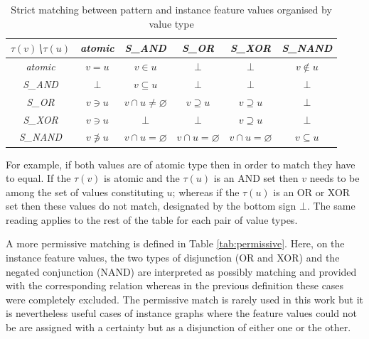 \begin{table}[!ht]
    \centering
    \begin{tabular}{|c|c|c|c|c|c|}
        \hline
        \textit{$\tau(v)$\textbackslash $\tau(u)$} & \textit{atomic} & \textit{S_{AND}}                 & \textit{S_{OR}}              & \textit{S_{XOR}}             & \textit{S_{NAND}}            \\ \hline
        \textit{atomic}             & $v=u$             & $v \in u$                         & $\bot$                          & $\bot$                          & $v \notin u$                   \\ \hline
        \textit{S_{AND}}              & $\bot$               & $v \subseteq u$                     & $\bot$                          & $\bot$                          & $\bot$ \\ \hline
        \textit{S_{OR}}               & $v \ni u$          & $ v \cap u \neq \varnothing $ &                        $v \supseteq u $              & $v \supseteq u $   & $\bot$ \\ \hline
        \textit{S_{XOR}}              & $v \ni u$          & $\bot$                              & $\bot$                        & $v \supseteq u$             & $\bot$ \\ \hline
        \textit{S_{NAND}}             & $v \not\ni u$      & $v \cap u = \varnothing$     & $v \cap u = \varnothing$ & $v \cap u = \varnothing$ & $ v \subseteq u $                          \\ \hline
    \end{tabular}
    \caption{Strict matching between pattern and instance feature values organised by value type}
    \label{tab:strict}
\end{table}

For example, if both values are of atomic type then in order to match they have to equal. If the $\tau(v)$ is atomic and the $\tau(u)$ is an AND set then $v$ needs to be among the set of values constituting $u$; whereas if the $\tau(u)$ is an OR or XOR set then these values do not match, designated by the bottom sign $\bot$. The same reading applies to the rest of the table for each pair of value types. 

A more permissive matching is defined in Table \ref{tab:permissive}. Here, on the instance feature values, the two types of disjunction (OR and XOR) and the negated conjunction (NAND) are interpreted as possibly matching and provided with the corresponding relation whereas in the previous definition these cases were completely excluded. The permissive match is rarely used in this work but it is nevertheless useful cases of instance graphs where the feature values could not be are assigned with a certainty but as a disjunction of either one or the other. 

